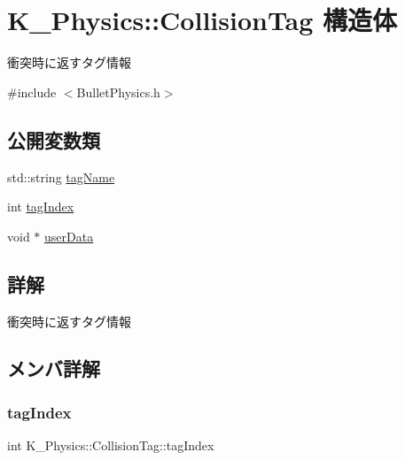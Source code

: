 \hypertarget{struct_k___physics_1_1_collision_tag}{}\section{K\+\_\+\+Physics\+:\+:Collision\+Tag 構造体}
\label{struct_k___physics_1_1_collision_tag}


衝突時に返すタグ情報  




{\ttfamily \#include $<$Bullet\+Physics.\+h$>$}

\subsection*{公開変数類}
\begin{DoxyCompactItemize}
\item 
std\+::string \mbox{\hyperlink{struct_k___physics_1_1_collision_tag_afa1f88c74c5dbaec8943ec444c891cc4}{tag\+Name}}
\item 
int \mbox{\hyperlink{struct_k___physics_1_1_collision_tag_a1909a79ab275b8d7498a2464c3164560}{tag\+Index}}
\item 
void $\ast$ \mbox{\hyperlink{struct_k___physics_1_1_collision_tag_a246e8b0daa7a3b70e80e19cecf002699}{user\+Data}}
\end{DoxyCompactItemize}


\subsection{詳解}
衝突時に返すタグ情報 

\subsection{メンバ詳解}
\mbox{\label{struct_k___physics_1_1_collision_tag_a1909a79ab275b8d7498a2464c3164560}} 
\subsubsection{\texorpdfstring{tag\+Index}{tagIndex}}
{\footnotesize\ttfamily int K\+\_\+\+Physics\+::\+Collision\+Tag\+::tag\+Index}

